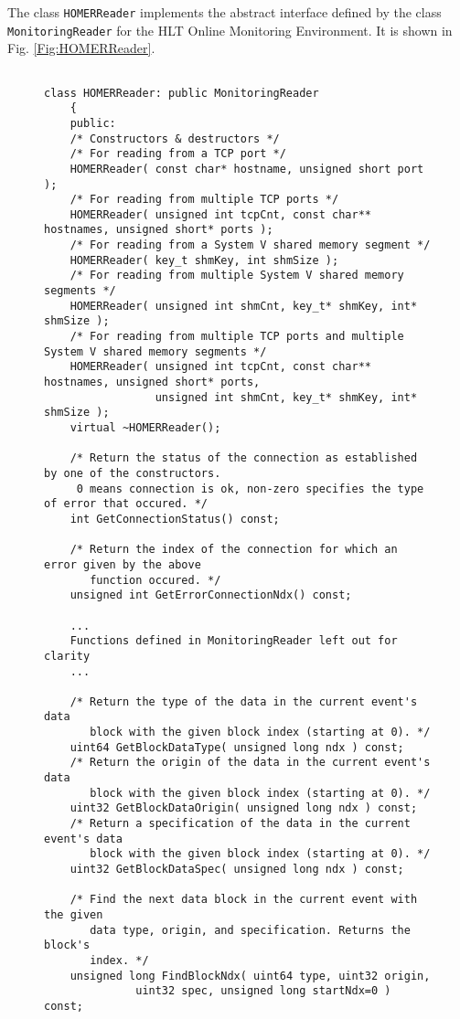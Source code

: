 \documentclass[a4paper,twoside]{article}
\begin{document}
The class \texttt{HOMERReader} implements the abstract interface defined by the class \texttt{MonitoringReader} for the HLT Online Monitoring Environment. 
It is shown in Fig. \ref{Fig:HOMERReader}. 

\begin{figure}[hbt]
{\footnotesize
\begin{verbatim}

class HOMERReader: public MonitoringReader
    {
    public:
    /* Constructors & destructors */
    /* For reading from a TCP port */
    HOMERReader( const char* hostname, unsigned short port );
    /* For reading from multiple TCP ports */
    HOMERReader( unsigned int tcpCnt, const char** hostnames, unsigned short* ports );
    /* For reading from a System V shared memory segment */
    HOMERReader( key_t shmKey, int shmSize );
    /* For reading from multiple System V shared memory segments */
    HOMERReader( unsigned int shmCnt, key_t* shmKey, int* shmSize );
    /* For reading from multiple TCP ports and multiple System V shared memory segments */
    HOMERReader( unsigned int tcpCnt, const char** hostnames, unsigned short* ports, 
                 unsigned int shmCnt, key_t* shmKey, int* shmSize );
    virtual ~HOMERReader();

    /* Return the status of the connection as established by one of the constructors.
     0 means connection is ok, non-zero specifies the type of error that occured. */
    int GetConnectionStatus() const;

    /* Return the index of the connection for which an error given by the above
       function occured. */
    unsigned int GetErrorConnectionNdx() const;

    ...
    Functions defined in MonitoringReader left out for clarity
    ...

    /* Return the type of the data in the current event's data
       block with the given block index (starting at 0). */
    uint64 GetBlockDataType( unsigned long ndx ) const;
    /* Return the origin of the data in the current event's data
       block with the given block index (starting at 0). */
    uint32 GetBlockDataOrigin( unsigned long ndx ) const;
    /* Return a specification of the data in the current event's data
       block with the given block index (starting at 0). */
    uint32 GetBlockDataSpec( unsigned long ndx ) const;

    /* Find the next data block in the current event with the given
       data type, origin, and specification. Returns the block's 
       index. */
    unsigned long FindBlockNdx( uint64 type, uint32 origin, 
			  uint32 spec, unsigned long startNdx=0 ) const;


\end{verbatim}}
\end{figure}
\end{document}
